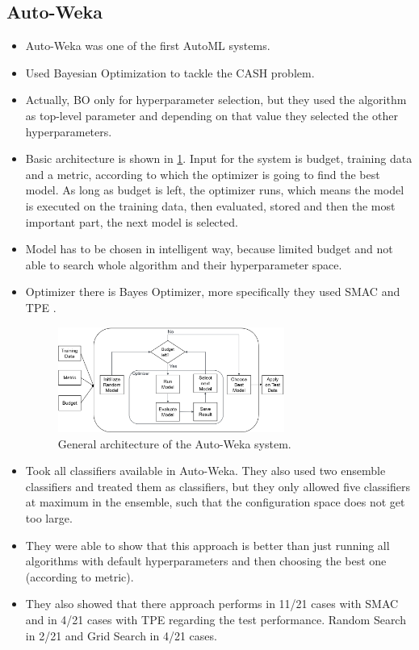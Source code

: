 \subsection{Auto-Weka}
\begin{itemize}
    \item Auto-Weka \cite{ThorntonAuto-WEKA:Algorithms, Kotthoff2017Auto-WEKAWEKA} was one of the first \gls{AutoML} systems.
    \item Used Bayesian Optimization to tackle the \gls{CASH} problem.
    \item Actually, \gls{BO} only for hyperparameter selection, but they used the algorithm as top-level parameter and depending on that value they selected the other hyperparameters.
    \item Basic architecture is shown in \cref{fig:autoweka}.
    Input for the system is budget, training data and a metric, according to which the optimizer is going to find the best model.
    As long as budget is left, the optimizer runs, which means the model is executed on the training data, then evaluated, stored and then the most important part, the next model is selected.
    \item Model has to be chosen in intelligent way, because limited budget and not able to search whole algorithm and their hyperparameter space.
    \item Optimizer there is Bayes Optimizer, more specifically they used \gls{SMAC} \cite{HutterSequentialConfiguration} and \gls{TPE} \cite{BergstraAlgorithmsOptimization}.
    \begin{figure}
        \centering
        \includegraphics[width=0.7\textwidth]{graphics/auto_weka_arch.png}
        \caption{General architecture of the Auto-Weka system.}
        \label{fig:autoweka}
    \end{figure}
    \item Took all classifiers available in Auto-Weka. 
    They also used two ensemble classifiers and treated them as classifiers, but they only allowed five classifiers at maximum in the ensemble, such that the configuration space does not get too large.
    \item They were able to show that this approach is better than just running all algorithms with default hyperparameters and then choosing the best one (according to metric).
    \item They also showed that there approach performs in 11/21 cases with \gls{SMAC} and in 4/21 cases with \gls{TPE} regarding the test performance. Random Search in 2/21 and Grid Search in 4/21 cases.
\end{itemize}

